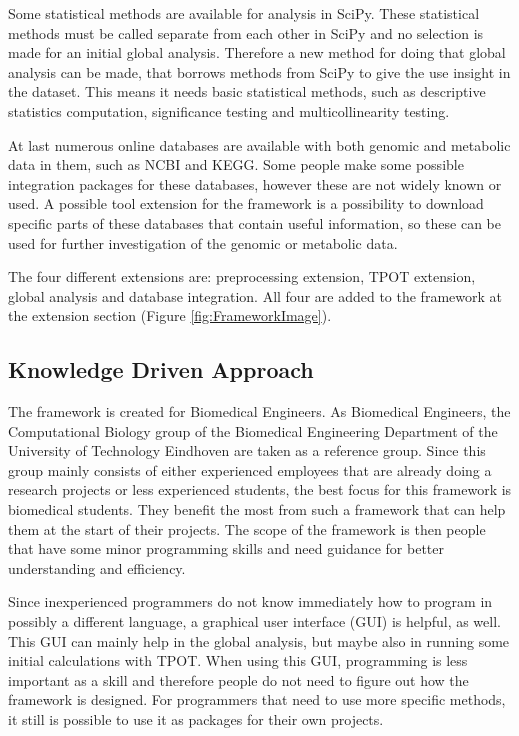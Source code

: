 \documentclass[10pt,a4paper]{article}
\begin{document}
	Some statistical methods are available for analysis in SciPy. These statistical methods must be called separate from each other in SciPy and no selection is made for an initial global analysis. Therefore a new method for doing that global analysis can be made, that borrows methods from SciPy to give the use insight in the dataset. This means it needs basic statistical methods, such as descriptive statistics computation, significance testing and multicollinearity testing. 
	
	At last numerous online databases are available with both genomic and metabolic data in them, such as NCBI and KEGG. Some people make some possible integration packages for these databases, however these are not widely known or used. A possible tool extension for the framework is a possibility to download specific parts of these databases that contain useful information, so these can be used for further investigation of the genomic or metabolic data.
	
	The four different extensions are: preprocessing extension, TPOT extension, global analysis and database integration. All four are added to the framework at the extension section (Figure \ref{fig:FrameworkImage}).
	
	\subsection{Knowledge Driven Approach}
	\label{subsec:KnowledgeDrivenApproach}
	
	The framework is created for Biomedical Engineers. As Biomedical Engineers, the Computational Biology group of the Biomedical Engineering Department of the University of Technology Eindhoven are taken as a reference group. Since this group mainly consists of either experienced employees that are already doing a research projects or less experienced students, the best focus for this framework is biomedical students. They benefit the most from such a framework that can help them at the start of their projects. The scope of the framework is then people that have some minor programming skills and need guidance for better understanding and efficiency.
	
	Since inexperienced programmers do not know immediately how to program in possibly a different language, a graphical user interface (GUI) is helpful, as well. This GUI can mainly help in the global analysis, but maybe also in running some initial calculations with TPOT. When using this GUI, programming is less important as a skill and therefore people do not need to figure out how the framework is designed. For programmers that need to use more specific methods, it still is possible to use it as packages for their own projects.
	
\end{document}
